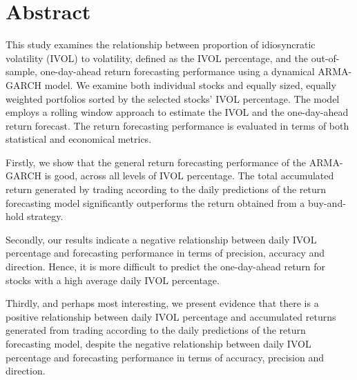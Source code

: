 \chapter{Abstract}
This study examines the relationship between proportion of idiosyncratic volatility (IVOL) to volatility, defined as the IVOL percentage, and the out-of-sample, one-day-ahead return forecasting performance using a dynamical ARMA-GARCH model. We examine both individual stocks and equally sized, equally weighted portfolios sorted by the selected stocks' IVOL percentage. The model employs a rolling window approach to estimate the IVOL and the one-day-ahead return forecast. The return forecasting performance is evaluated in terms of both statistical and economical metrics.

Firstly, we show that the general return forecasting performance of the ARMA-GARCH is good, across all levels of IVOL percentage. The total accumulated return generated by trading according to the daily predictions of the return forecasting model significantly outperforms the return obtained from a buy-and-hold strategy.

Secondly, our results indicate a negative relationship between daily IVOL percentage and forecasting performance in terms of precision, accuracy and direction. Hence, it is more difficult to predict the one-day-ahead return for stocks with a high average daily IVOL percentage.

Thirdly, and perhaps most interesting, we present evidence that there is a positive relationship between daily IVOL percentage and accumulated returns generated from trading according to the daily predictions of the return forecasting model, despite the negative relationship between daily IVOL percentage and forecasting performance in terms of accuracy, precision and direction.

